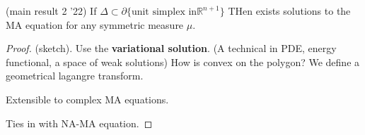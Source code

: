 \begin{theorem}
	(main result 2 '22)
	If $\Delta  \subset  \partial \{\text{unit simplex in} \mathbb{R}^{n+1} \} $ THen exists solutions to the MA equation for any symmetric measure $\mu$.
\end{theorem}

\begin{proof}
	(sketch). Use the \textbf{variational solution}. (A technical in PDE, energy functional, a space of weak solutions) How is convex on the polygon? We define a geometrical lagangre transform.

	Extensible to complex MA equations.

	Ties in with NA-MA equation.
\end{proof}




